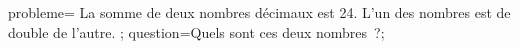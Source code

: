 \documentclass[exercice]{thedocument}%
\begin{document}
%
    \>probleme={%
       La somme de deux nombres décimaux est 24. L'un des nombres est de double de l'autre.%
    };%
    \>question=Quels sont ces deux nombres~?;%
\end{document}
